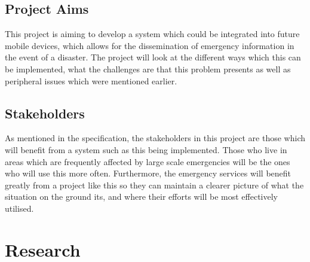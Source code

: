 \documentclass{report}
\begin{document}
\section{Project Aims}
This project is aiming to develop a system which could be integrated into future mobile devices, which allows for the dissemination of emergency information in the event of a disaster. The project will look at the different ways which this can be implemented, what the challenges are that this problem presents as well as peripheral issues which were mentioned earlier.  

\section{Stakeholders}
As mentioned in the specification, the stakeholders in this project are those which will benefit from a system such as this being implemented. Those who live in areas which are frequently affected by large scale emergencies will be the ones who will use this more often. Furthermore, the emergency services will benefit greatly from a project like this so they can maintain a clearer picture of what the situation on the ground its, and where their efforts will be most effectively utilised.  

\chapter{Research}
\end{document}
